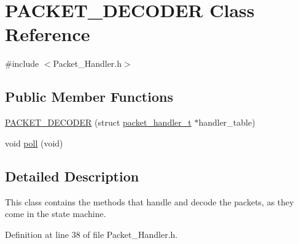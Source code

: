 \hypertarget{class_p_a_c_k_e_t___d_e_c_o_d_e_r}{\section{P\-A\-C\-K\-E\-T\-\_\-\-D\-E\-C\-O\-D\-E\-R Class Reference}
\label{class_p_a_c_k_e_t___d_e_c_o_d_e_r}
}


{\ttfamily \#include $<$Packet\-\_\-\-Handler.\-h$>$}

\subsection*{Public Member Functions}
\begin{DoxyCompactItemize}
\item 
\hyperlink{class_p_a_c_k_e_t___d_e_c_o_d_e_r_a210b11b58c2f35ff26a98ed65ae3ac20}{P\-A\-C\-K\-E\-T\-\_\-\-D\-E\-C\-O\-D\-E\-R} (struct \hyperlink{structpacket__handler__t}{packet\-\_\-handler\-\_\-t} $\ast$handler\-\_\-table)
\item 
void \hyperlink{class_p_a_c_k_e_t___d_e_c_o_d_e_r_aacc1d30b83089361e2b94b8be4719a8c}{poll} (void)
\end{DoxyCompactItemize}


\subsection{Detailed Description}
This class contains the methods that handle and decode the packets, as they come in the state machine. 

Definition at line 38 of file Packet\-\_\-\-Handler.\-h.



